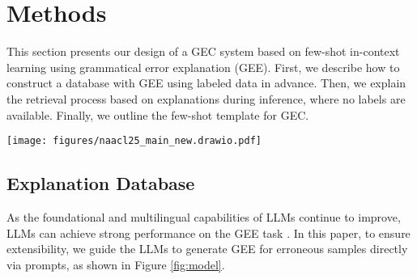 \section{Methods}
This section presents our design of a GEC system based on few-shot in-context learning using grammatical error explanation (GEE). First, we describe how to construct a database with GEE using labeled data in advance. Then, we explain the retrieval process based on explanations during inference, where no labels are available. Finally, we outline the few-shot template for GEC.


\begin{figure*}[ht]
    \centering
    \texttt{[image: figures/naacl25\_main\_new.drawio.pdf]}
    \caption{The proposed pipeline for few-shot GEC using the explanation-based demonstration retrieval method. As shown on the left side, we construct sample databases that include explanations. As illustrated on the right side, in the prediction stage, the erroneous samples for in-context demonstrations are retrieved using explanations.
}
    \label{fig:model}
\end{figure*}


\subsection{Explanation Database}



As the foundational and multilingual capabilities of LLMs continue to improve, LLMs can achieve strong performance on the GEE task \cite{song-etal-2024-gee}. In this paper, to ensure extensibility, we guide the LLMs to generate GEE for erroneous samples directly via prompts, as shown in Figure \ref{fig:model}. 

